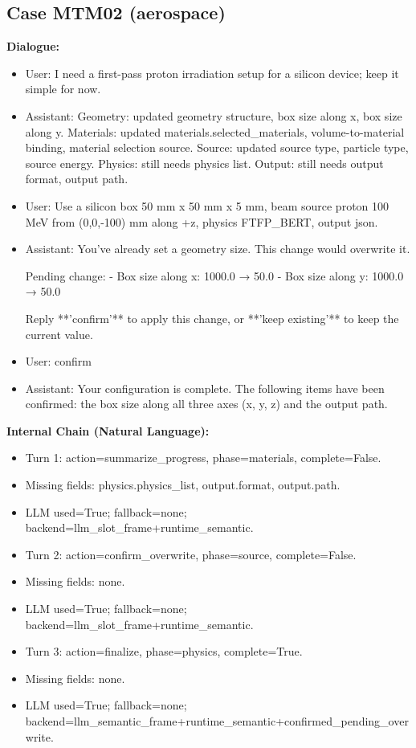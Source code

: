 \documentclass[11pt]{ctexart}
\begin{document}
\subsection{Case MTM02 (aerospace)}
\textbf{Dialogue:}
\begin{itemize}
\item User: I need a first-pass proton irradiation setup for a silicon device; keep it simple for now.
\item Assistant: Geometry: updated geometry structure, box size along x, box size along y. Materials: updated materials.selected\_materials, volume-to-material binding, material selection source. Source: updated source type, particle type, source energy. Physics: still needs physics list. Output: still needs output format, output path.
\item User: Use a silicon box 50 mm x 50 mm x 5 mm, beam source proton 100 MeV from (0,0,-100) mm along +z, physics FTFP\_BERT, output json.
\item Assistant: You've already set a geometry size. This change would overwrite it.

Pending change:
- Box size along x: 1000.0 → 50.0
- Box size along y: 1000.0 → 50.0

Reply **'confirm'** to apply this change, or **'keep existing'** to keep the current value.
\item User: confirm
\item Assistant: Your configuration is complete. The following items have been confirmed: the box size along all three axes (x, y, z) and the output path.
\end{itemize}
\textbf{Internal Chain (Natural Language):}
\begin{itemize}
\item Turn 1: action=summarize\_progress, phase=materials, complete=False.
\item Missing fields: physics.physics\_list, output.format, output.path.
\item LLM used=True; fallback=none; backend=llm\_slot\_frame+runtime\_semantic.
\item Turn 2: action=confirm\_overwrite, phase=source, complete=False.
\item Missing fields: none.
\item LLM used=True; fallback=none; backend=llm\_slot\_frame+runtime\_semantic.
\item Turn 3: action=finalize, phase=physics, complete=True.
\item Missing fields: none.
\item LLM used=True; fallback=none; backend=llm\_semantic\_frame+runtime\_semantic+confirmed\_pending\_overwrite.
\end{itemize}
\end{document}
